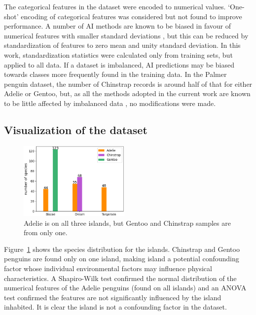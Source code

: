 \documentclass[a4paper, 11pt]{article}
\begin{document}
The categorical features in the dataset were encoded to numerical values. `One-shot' encoding of 
categorical features was considered but not found to 
improve performance. A number of AI methods are known to be biased in favour of numerical features 
with smaller standard deviations \cite{hastie2009elements}, but this can be reduced by standardization 
of features to zero mean and unity standard deviation. In this work, 
standardization statistics were calculated only from training sets, but applied to all data. 
If a dataset is imbalanced, 
AI predictions may be biased towards classes more frequently found in the training data. 
In the Palmer penguin dataset, the number of Chinstrap records is around half of that for either Adelie or Gentoo, 
but, as all the methods adopted in the current work are known to be little affected by 
imbalanced data \cite{he2009learning}, no modifications were made.

\subsection*{Visualization of the dataset}

\begin{figure} %
  \centering
  \vspace{0\baselineskip} %
  \includegraphics[width=0.48\textwidth]{islands.png} %
  \vspace{-0.5\baselineskip} %
  \caption{\centering\linespread{0.8}\selectfont Adelie is on all three islands, but Gentoo and Chinstrap samples are from only one.}
  \vspace{-0.5\baselineskip} %
  \label{fig:islands}
\end{figure}
Figure~\ref{fig:islands} shows the species distribution for the islands. 
Chinstrap and Gentoo penguins are found only on one island, making island a potential confounding factor whose 
individual environmental factors may influence physical characteristics. 
A Shapiro-Wilk test confirmed the normal distribution of the numerical features of the Adelie penguins (found on 
all islands) and an ANOVA test confirmed the features are not significantly influenced by the island inhabited. 
It is clear the island is not a confounding factor in the dataset.
\end{document}
